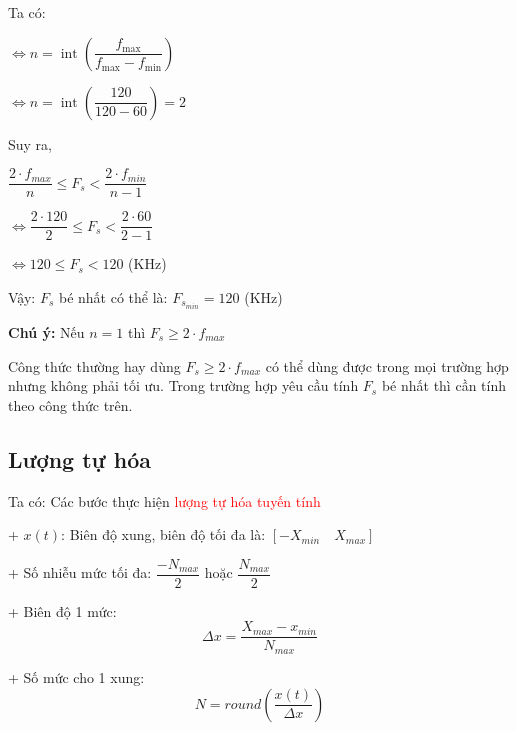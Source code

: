 Ta có:

\hspace*{1cm} $\iff n = \operatorname{int}\left(\dfrac{f_{\max}}{f_{\max} - f_{\min}}\right)$

\hspace*{1cm} $\iff n = \operatorname{int}\left(\dfrac{120}{120 - 60}\right) = 2$

Suy ra,

\hspace*{2cm} $\dfrac{2 \cdot f_{max}}{n} \leq F_s < \dfrac{2 \cdot f_{min}}{n - 1}$

\hspace*{1cm} $\iff \dfrac{2 \cdot 120}{2} \leq F_s < \dfrac{2 \cdot 60}{2 - 1}$

\hspace*{1cm} $\iff 120 \leq F_s < 120$ (KHz)

Vậy: $F_s$ bé nhất có thể là: $F_{s_{min}} = 120$ (KHz)

\vspace{1cm}

\noindent\textbf{Chú ý:} Nếu $n = 1$ thì $F_s \geq 2 \cdot f_{max}$

\noindent Công thức thường hay dùng $F_s \geq 2\cdot f_{max}$ có thể dùng được trong mọi trường hợp nhưng không phải tối ưu. Trong trường hợp yêu cầu tính $F_s$ bé nhất thì cần tính theo công thức trên.

\subsection{Lượng tự hóa}

\begin{center}
    
\end{center}

Ta có: Các bước thực hiện \textcolor{red}{lượng tự hóa tuyến tính}

\hspace*{0.5cm}+ $x(t)$: Biên độ xung, biên độ tối đa là: $[-X_{min} \quad X_{max}]$

\hspace*{0.5cm}+ Số nhiễu mức tối đa: $\dfrac{-N_{max}}{2}$ hoặc $\dfrac{N_{max}}{2}$

\hspace*{0.5cm}+ Biên độ 1 mức:
\[
    \boxed{
        \Delta x = \dfrac{X_{max} - x_{min}}{N_{max}}
    }
\]

\hspace*{0.5cm}+ Số mức cho 1 xung:
\[
    \boxed{
        N = round\left(\dfrac{x(t)}{\Delta x}\right)
    }
\]

